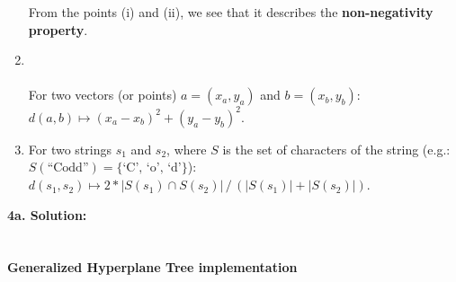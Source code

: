 \documentclass{article}
\begin{document}
\begin{enumerate}
    From the points (i) and (ii), we see that it describes the \textbf{non-negativity property}.
  \item\label{l2} 

\\
\\

For two vectors (or points) $a=(x_a, y_a)$ and $b=(x_b, y_b)$:
 $d(a, b) \mapsto ( x_a - x_b )^2 + ( y_a - y_b )^2$.
 
 
 

      \item\label{l3} 
      For two strings $s_1$ and $s_2$, where $S$ is the set of characters of the string (e.g.: $S(\text{``Codd''}) = \{\text{`C', `o', `d'}\}$):
      $d(s_1, s_2) \mapsto 2* |S(s_1) \cap S(s_2)| \, / \, (|S(s_1)| + |S(s_2)|)$.\\

    \end{enumerate}

\newpage

 

\textbf{4a. Solution:}
\\
\\
\\
\textbf{Generalized Hyperplane Tree implementation}
\\
\\
\\
\\
\\
\\
\end{document}
